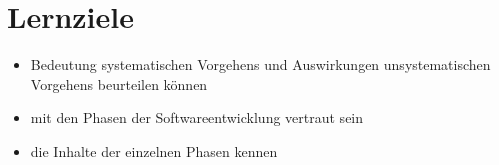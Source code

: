 \section{Lernziele}
\begin{itemize}
    \item Bedeutung systematischen Vorgehens und Auswirkungen unsystematischen Vorgehens beurteilen können
    \item mit den Phasen der Softwareentwicklung vertraut sein
    \item die Inhalte der einzelnen Phasen kennen
\end{itemize}